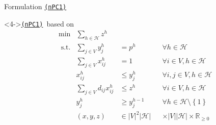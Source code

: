 \documentclass[utf8,aspectratio=1610,ngerman,english]{beamer}
\newcommand{\nPC}{\hyperref[eq:nPC]{\texttt{(nPC1)}}\xspace}
\newcommand{\inH}{h \in \mathcal H}
\begin{document}
\begin{frame}{Formulation \nPC}
\begin{minipage}[t]{0.48\textwidth}
\begin{block}
        \end{block}
    \end{minipage}
    \begin{minipage}[t]{0.48\textwidth}
        \begin{block}<4->{\nPC\ based on \citet{wiley2013}}
            \vspace*{-12pt}
            \begin{subequations}
                \begin{alignat}{3}
                     & \min         & \sum_{\inH}z^{h}             &                                                                              \\
                     & \text{ s.t.} & \sum_{j \in V}y_{j}^h        & =     p^{h}           &  & \forall \inH                                      \\
                     &              & \sum_{j \in V}x_{ij}^h       & =     1               &  & \forall i \in V, \inH                             \\
                     &              & x_{ij}^h                     & \leq  y_j^{h}         &  & \forall i,j \in V, \inH                           \\
                     &              & \sum_{j \in V}d_{ij}x_{ij}^h & \leq  z^{h}           &  & \forall i \in V, \inH                             \\
                     &              & y_{j}^h                      & \geq  y_j^{h-1}       &  & \forall \inH \setminus \left \{1 \right \}        \\
                     &              & (x,y,z)                      & \in |V|^2|\mathcal H| &  & \times |V||\mathcal H| \times \mathbb{R}_{\geq 0}
                \end{alignat}  \label{eq:nPC}
            \end{subequations}
        \end{block}
    \end{minipage}
\end{frame}
\end{document}
